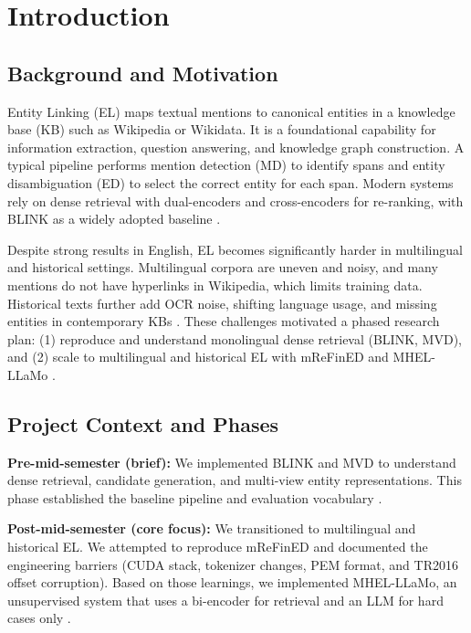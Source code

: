 \chapter{Introduction}
\label{ch:introduction}

\section{Background and Motivation}
Entity Linking (EL) maps textual mentions to canonical entities in a knowledge base (KB) such as Wikipedia or Wikidata. It is a foundational capability for information extraction, question answering, and knowledge graph construction. A typical pipeline performs mention detection (MD) to identify spans and entity disambiguation (ED) to select the correct entity for each span. Modern systems rely on dense retrieval with dual-encoders and cross-encoders for re-ranking, with BLINK as a widely adopted baseline \cite{wu2020blink}.

Despite strong results in English, EL becomes significantly harder in multilingual and historical settings. Multilingual corpora are uneven and noisy, and many mentions do not have hyperlinks in Wikipedia, which limits training data. Historical texts further add OCR noise, shifting language usage, and missing entities in contemporary KBs \cite{arora2024}. These challenges motivated a phased research plan: (1) reproduce and understand monolingual dense retrieval (BLINK, MVD), and (2) scale to multilingual and historical EL with mReFinED and MHEL-LLaMo \cite{mvd2023,mrefined2023,mhelllamo2026}.

\section{Project Context and Phases}
\textbf{Pre-mid-semester (brief):} We implemented BLINK and MVD to understand dense retrieval, candidate generation, and multi-view entity representations. This phase established the baseline pipeline and evaluation vocabulary \cite{mvd2023}.

\textbf{Post-mid-semester (core focus):} We transitioned to multilingual and historical EL. We attempted to reproduce mReFinED \cite{mrefined2023} and documented the engineering barriers (CUDA stack, tokenizer changes, PEM format, and TR2016 offset corruption). Based on those learnings, we implemented MHEL-LLaMo, an unsupervised system that uses a bi-encoder for retrieval and an LLM for hard cases only \cite{mhelllamo2026}.

